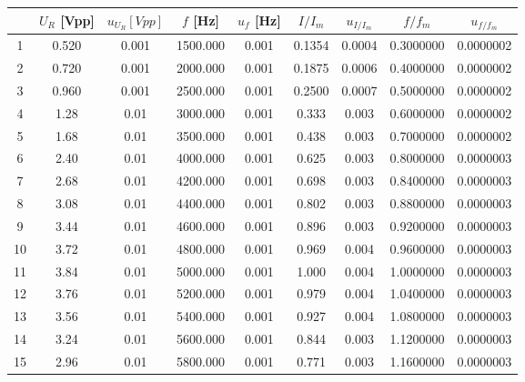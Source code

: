 \documentclass[a4paper]{article}
\begin{document}
\begin{table}[htbp]
	\centering
	\begin{tabular}{ccccccccc}
		\hline
		   & $U_R$ [Vpp] & $u_{U_R} [Vpp]$ & $f$ [Hz] & $u_f$ [Hz] & $I/I_m$ & $u_{I/I_m}$ & $f/f_m$   & $u_{f/f_m}$ \\
		\hline
		1  & 0.520       & 0.001           & 1500.000 & 0.001      & 0.1354  & 0.0004      & 0.3000000 & 0.0000002   \\
		2  & 0.720       & 0.001           & 2000.000 & 0.001      & 0.1875  & 0.0006      & 0.4000000 & 0.0000002   \\
		3  & 0.960       & 0.001           & 2500.000 & 0.001      & 0.2500  & 0.0007      & 0.5000000 & 0.0000002   \\
		4  & 1.28        & 0.01            & 3000.000 & 0.001      & 0.333   & 0.003       & 0.6000000 & 0.0000002   \\
		5  & 1.68        & 0.01            & 3500.000 & 0.001      & 0.438   & 0.003       & 0.7000000 & 0.0000002   \\
		6  & 2.40        & 0.01            & 4000.000 & 0.001      & 0.625   & 0.003       & 0.8000000 & 0.0000003   \\
		7  & 2.68        & 0.01            & 4200.000 & 0.001      & 0.698   & 0.003       & 0.8400000 & 0.0000003   \\
		8  & 3.08        & 0.01            & 4400.000 & 0.001      & 0.802   & 0.003       & 0.8800000 & 0.0000003   \\
		9  & 3.44        & 0.01            & 4600.000 & 0.001      & 0.896   & 0.003       & 0.9200000 & 0.0000003   \\
		10 & 3.72        & 0.01            & 4800.000 & 0.001      & 0.969   & 0.004       & 0.9600000 & 0.0000003   \\
		11 & 3.84        & 0.01            & 5000.000 & 0.001      & 1.000   & 0.004       & 1.0000000 & 0.0000003   \\
		12 & 3.76        & 0.01            & 5200.000 & 0.001      & 0.979   & 0.004       & 1.0400000 & 0.0000003   \\
		13 & 3.56        & 0.01            & 5400.000 & 0.001      & 0.927   & 0.004       & 1.0800000 & 0.0000003   \\
		14 & 3.24        & 0.01            & 5600.000 & 0.001      & 0.844   & 0.003       & 1.1200000 & 0.0000003   \\
		15 & 2.96        & 0.01            & 5800.000 & 0.001      & 0.771   & 0.003       & 1.1600000 & 0.0000003   \\

\end{tabular}
\end{table}
\end{document}
